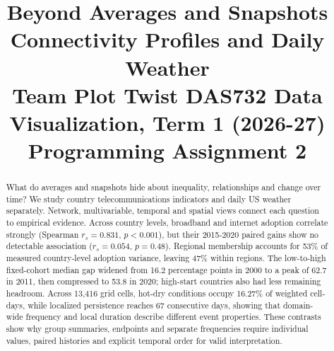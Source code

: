 \documentclass[conference,a4paper]{IEEEtran}
\begin{document}
\raggedbottom
\title{Beyond Averages and Snapshots\\{\large Connectivity Profiles and Daily Weather}\\[3pt]{\normalsize Team Plot Twist \textbullet{} DAS732 Data Visualization, Term 1 (2026-27)}\\{\normalsize Programming Assignment 2}}
\author{
\and
{}
\and
{}
}
\maketitle
\pagestyle{plain}
\thispagestyle{plain}



\begin{abstract}What do averages and snapshots hide about inequality, relationships and change over time? We study country telecommunications indicators and daily US weather separately. Network, multivariable, temporal and spatial views connect each question to empirical evidence. Across country levels, broadband and internet adoption correlate strongly (Spearman $r_s = 0.831$, $p < 0.001$), but their 2015-2020 paired gains show no detectable association ($r_s = 0.054$, $p = 0.48$). Regional membership accounts for 53\% of measured country-level adoption variance, leaving 47\% within regions. The low-to-high fixed-cohort median gap widened from 16.2 percentage points in 2000 to a peak of 62.7 in 2011, then compressed to 53.8 in 2020; high-start countries also had less remaining headroom. Across 13,416 grid cells, hot-dry conditions occupy 16.27\% of weighted cell-days, while localized persistence reaches 67 consecutive days, showing that domain-wide frequency and local duration describe different event properties. These contrasts show why group summaries, endpoints and separate frequencies require individual values, paired histories and explicit temporal order for valid interpretation.\end{abstract}
\end{document}
